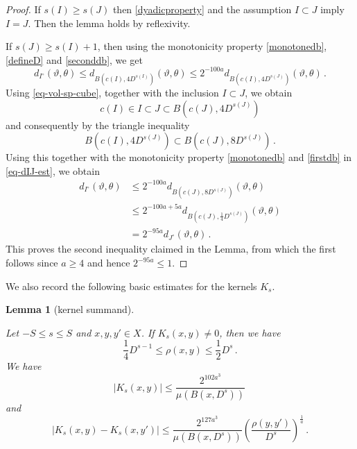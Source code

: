 \documentclass[10pt,a4paper]{article}
\theoremstyle{plain}
\newtheorem{lemma}[theorem]{Lemma}
\theoremstyle{definition}
\numberwithin{equation}{subsection}
\newcommand{\mfa}{{\vartheta}}
\newcommand{\mfb}{{\theta}}
\newcommand{\lean}[1]{}
\newcommand{\leanok}{}
\begin{document}
\begin{proof}
    \leanok
    If $s(I) \ge s(J)$ then \eqref{dyadicproperty} and the assumption $I\subset J$ imply $I = J$. Then the lemma holds by reflexivity.

    If $s(J) \ge s(I)+1$, then using the monotonicity property \eqref{monotonedb}, \eqref{defineD} and \eqref{seconddb}, we get
    \begin{equation}
    \label{eq-dIJ-est}
        d_{I^\circ}(\mfa, \mfb) \le d_{B(c(I), 4 D^{s(I)})}(\mfa, \mfb) \le 2^{-100a} d_{B(c(I), 4D^{s(J)})}(\mfa, \mfb)\,.
    \end{equation}
    Using \eqref{eq-vol-sp-cube}, together with the inclusion $I \subset J$, we obtain
    $$
        c(I) \in I \subset J \subset B(c(J), 4 D^{s(J)})
    $$
    and consequently by the triangle inequality
    $$
        B(c(I), 4 D^{s(J)}) \subset B(c(J), 8 D^{s(J)})\,.
    $$
    Using this together with the monotonicity property \eqref{monotonedb} and \eqref{firstdb} in \eqref{eq-dIJ-est}, we obtain
    \begin{align*}
        d_{I^\circ}(\mfa, \mfb) &\le 2^{-100a} d_{B(c(J), 8D^{s(J)})}(\mfa, \mfb)\\
        &\le 2^{-100a + 5a} d_{B(c(J), \frac{1}{4}D^{s(J)})}(\mfa, \mfb)\\
        &= 2^{-95a}d_{J^\circ}(\mfa, \mfb)\,.
    \end{align*}
    This proves the second inequality claimed in the Lemma, from which the first follows since $a \ge 4$ and hence $2^{-95a} \le 1$.
\end{proof}

We also record the following basic estimates for the kernels $K_s$.

\begin{lemma}[kernel summand]
\label{kernel-summand}
\leanok
\lean{dist_mem_Icc_of_Ks_ne_zero, enorm_Ks_le, enorm_Ks_sub_Ks_le}
    Let $-S\le s\le S$ and $x,y,y'\in X$.
    If $K_s(x,y)\neq 0$, then we have
    \begin{equation}\label{supp-Ks}
      \frac{1}{4} D^{s-1} \leq \rho(x,y) \leq \frac{1}{2} D^s\, .
    \end{equation}
    We have
    \begin{equation}
       \label{eq-Ks-size}
        |K_s(x,y)|\le \frac{2^{102 a^3}}{\mu(B(x, D^{s}))}\,
    \end{equation}
    and
    \begin{equation}
        \label{eq-Ks-smooth}
        |K_s(x,y)-K_s(x, y')|\le \frac{2^{127a^3}}{\mu(B(x, D^{s}))}
        \left(\frac{ \rho(y,y')}{D^s}\right)^{\frac 1a}\,.
    \end{equation}
\end{lemma}
\end{document}
